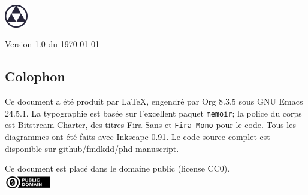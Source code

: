 \vspace{3cm}
\begin{flushright}
{\large\theauthor}
\end{flushright}

\vfill
\begin{center}
\includegraphics[width=1cm]{img/logo}
\end{center}

\vfill
\begin{center}
Version 1.0 du \today
\end{center}


\cleartoverso
\phantom{a}                     %
\vfill
\begin{minipage}{26pc}
\subsection*{Colophon}
Ce document a été produit par \LaTeX{}, engendré par Org 8.3.5 sous GNU Emacs
24.5.1.  La typographie est basée sur l'excellent paquet \texttt{memoir}; la
police du corps est Bitstream Charter, des titres \textsf{Fira Sans}
et \texttt{Fira Mono} pour le code.  Tous les diagrammes ont été faits avec
Inkscape 0.91.  Le code source complet est disponible sur
\href{https://github.com/fmdkdd/phd-manuscript}{github/fmdkdd/phd-manuscript}.

\vfill
\begin{center}
Ce document est placé dans le domaine public (license CC0).\\
\vspace{4pt}
\includegraphics[width=2cm]{img/cc-zero.png}
\end{center}
\end{minipage}


